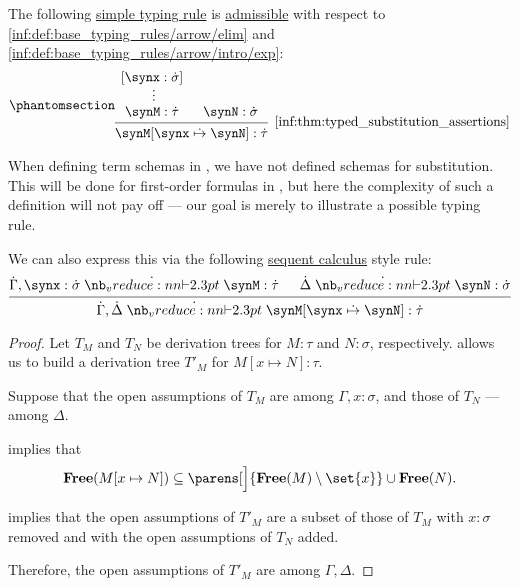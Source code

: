 \begin{proposition}\label{thm:typed_substitution_assertions}
  The following \hyperref[def:simple_typing_rule]{simple typing rule} is \hyperref[con:inference_rule_admissibility]{admissible} with respect to \ref{inf:def:base_typing_rules/arrow/elim} and \ref{inf:def:base_typing_rules/arrow/intro/exp}:
  \begin{equation*}\taglabel[\ensuremath{ Subst }]{inf:thm:typed_substitution_assertions}
    \begin{prooftree}
      \hypo{ [\synx: \syn\sigma] }
      \ellipsis {} { \synM: \syn\tau }

      \hypo{ \synN: \syn\sigma }
      \infer2[\ref{inf:thm:typed_substitution_assertions}]{ \synM[\synx \synsubst \synN]: \syn\tau }.
    \end{prooftree}
  \end{equation*}
\end{proposition}
\begin{comments}
  \item When defining term schemas in , we have not defined schemas for substitution. This will be done for first-order formulas in , but here the complexity of such a definition will not pay off --- our goal is merely to illustrate a possible typing rule.

  \item We can also express this via the following \hyperref[rem:sequent_calculus]{sequent calculus} style rule:
  \begin{equation*}
    \begin{prooftree}
      \hypo{ \syn\Gamma, \synx: \syn\sigma \synvdash \synM: \syn\tau }
      \hypo{ \syn\Delta \synvdash \synN: \syn\sigma }
      \infer2{ \syn\Gamma, \syn\Delta \synvdash \synM[\synx \synsubst \synN]: \syn\tau }.
    \end{prooftree}
  \end{equation*}
\end{comments}
\begin{proof}
  Let \( T_M \) and \( T_N \) be derivation trees for \( M: \tau \) and \( N: \sigma \), respectively.  allows us to build a derivation tree \( T'_M \) for \( M[x \mapsto N]: \tau \).

  Suppose that the open assumptions of \( T_M \) are among \( \Gamma, x: \sigma \), and those of \( T_N \) --- among \( \Delta \).

   implies that
  \begin{equation*}
    \op*{Free}(M[x \mapsto N]) \subseteq \parens[\Big]{ \op*{Free}(M) \setminus \set{ x } } \cup \op*{Free}(N).
  \end{equation*}

   implies that the open assumptions of \( T'_M \) are a subset of those of \( T_M \) with \( x: \sigma \) removed and with the open assumptions of \( T_N \) added.

  Therefore, the open assumptions of \( T'_M \) are among \( \Gamma, \Delta \).
\end{proof}


